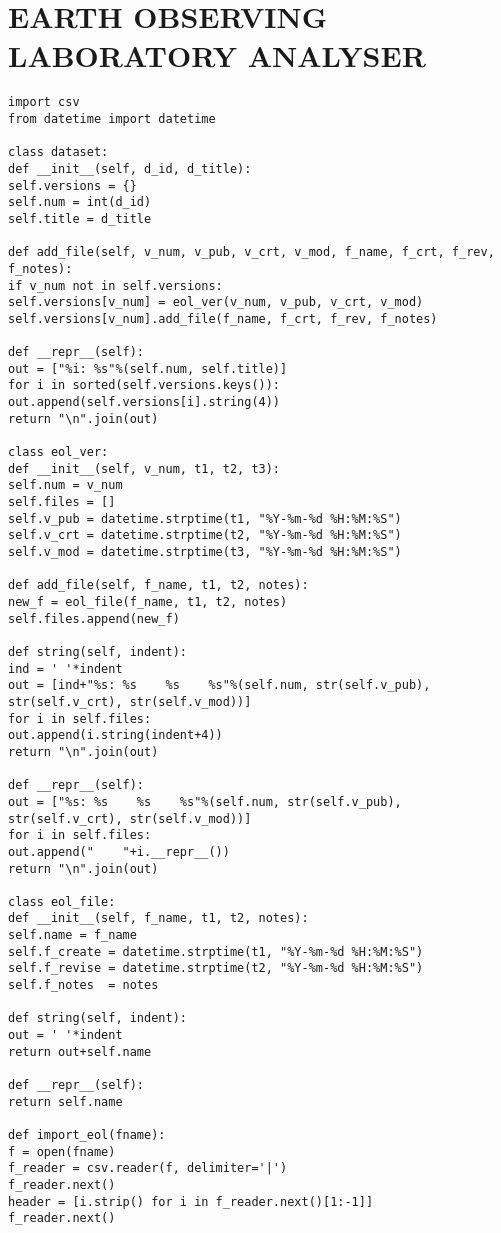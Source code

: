\chapter{EARTH OBSERVING LABORATORY ANALYSER}
\begin{verbatim}
import csv
from datetime import datetime

class dataset:
def __init__(self, d_id, d_title):
self.versions = {}
self.num = int(d_id)
self.title = d_title

def add_file(self, v_num, v_pub, v_crt, v_mod, f_name, f_crt, f_rev, f_notes):
if v_num not in self.versions:
self.versions[v_num] = eol_ver(v_num, v_pub, v_crt, v_mod)
self.versions[v_num].add_file(f_name, f_crt, f_rev, f_notes)

def __repr__(self):
out = ["%i: %s"%(self.num, self.title)]
for i in sorted(self.versions.keys()):
out.append(self.versions[i].string(4))
return "\n".join(out)

class eol_ver:
def __init__(self, v_num, t1, t2, t3):
self.num = v_num
self.files = []
self.v_pub = datetime.strptime(t1, "%Y-%m-%d %H:%M:%S")
self.v_crt = datetime.strptime(t2, "%Y-%m-%d %H:%M:%S")
self.v_mod = datetime.strptime(t3, "%Y-%m-%d %H:%M:%S")

def add_file(self, f_name, t1, t2, notes):
new_f = eol_file(f_name, t1, t2, notes)
self.files.append(new_f)

def string(self, indent):
ind = ' '*indent
out = [ind+"%s: %s    %s    %s"%(self.num, str(self.v_pub), str(self.v_crt), str(self.v_mod))]
for i in self.files:
out.append(i.string(indent+4))
return "\n".join(out)

def __repr__(self):
out = ["%s: %s    %s    %s"%(self.num, str(self.v_pub), str(self.v_crt), str(self.v_mod))]
for i in self.files:
out.append("    "+i.__repr__())
return "\n".join(out)

class eol_file:
def __init__(self, f_name, t1, t2, notes):
self.name = f_name
self.f_create = datetime.strptime(t1, "%Y-%m-%d %H:%M:%S")
self.f_revise = datetime.strptime(t2, "%Y-%m-%d %H:%M:%S")
self.f_notes  = notes

def string(self, indent):
out = ' '*indent
return out+self.name

def __repr__(self):
return self.name

def import_eol(fname):
f = open(fname)
f_reader = csv.reader(f, delimiter='|')
f_reader.next()
header = [i.strip() for i in f_reader.next()[1:-1]]
f_reader.next()


\end{verbatim}
